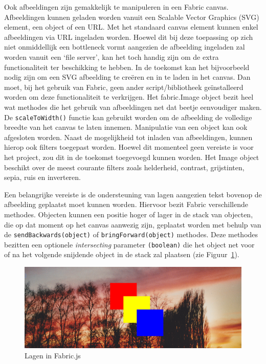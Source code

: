 Ook afbeeldingen zijn gemakkelijk te manipuleren in een Fabric canvas. Afbeeldingen kunnen geladen worden vanuit een Scalable Vector Graphics (SVG) element, een object of een URL. Met het standaard canvas element kunnen enkel afbeeldingen via URL ingeladen worden. Hoewel dit bij deze toepassing op zich niet onmiddellijk een bottleneck vormt aangezien de afbeelding ingeladen zal worden vanuit een `file server', kan het toch handig zijn om de extra functionaliteit ter beschikking te hebben. In de toekomst kan het bijvoorbeeld nodig zijn om een SVG afbeelding te cre\"{e}ren en in te laden in het canvas. Dan moet, bij het gebruik van Fabric, geen ander script/bibliotheek ge\"{i}nstalleerd worden om deze functionaliteit te verkrijgen. Het fabric.Image object bezit heel wat methodes die het gebruik van afbeeldingen net dat beetje eenvoudiger maken. De \texttt{scaleToWidth()} functie kan gebruikt worden om de afbeelding de volledige breedte van het canvas te laten innemen. Manipulatie van een object kan ook afgesloten worden. 
Naast de mogelijkheid tot inladen van afbeeldingen, kunnen hierop ook filters toegepast worden. Hoewel dit momenteel geen vereiste is voor het project, zou dit in de toekomst toegevoegd kunnen worden. Het Image object beschikt over de meest courante filters zoals helderheid, contrast, grijstinten, sepia, ruis en inverteren.  

Een belangrijke vereiste is de ondersteuning van lagen aangezien tekst bovenop de afbeelding geplaatst moet kunnen worden. Hiervoor bezit Fabric verschillende methodes. Objecten kunnen een positie hoger of lager in de stack van objecten, die op dat moment op het canvas aanwezig zijn, geplaatst worden met behulp van de \lstinline|sendBackwards(object)| of \lstinline|bringForward(object)| methodes. Deze methodes bezitten een optionele \textit{intersecting} parameter \texttt{(boolean)} die het object net voor of na het volgende snijdende object in de stack zal plaatsen (zie Figuur~\ref{fig:FabricLayers}). 

\begin{figure}[H]
	\centering
	\includegraphics[width=1\textwidth]{Figuren/FabricLayers.png}
	\caption{Lagen in Fabric.js} %
	\label{fig:FabricLayers}
\end{figure} 

